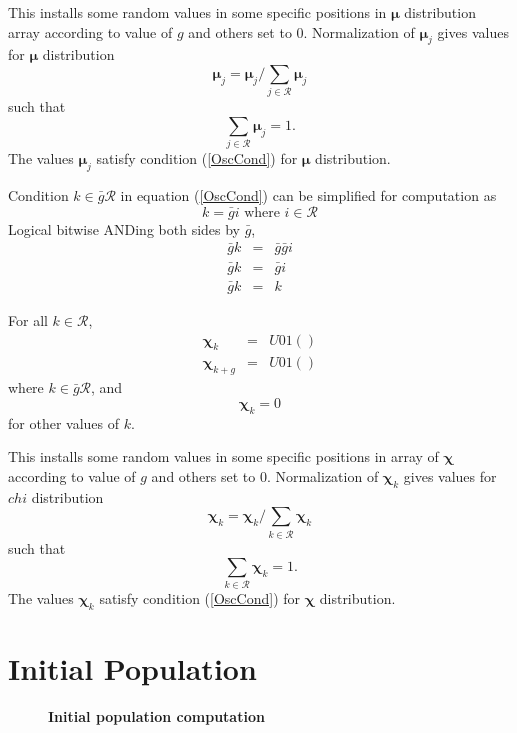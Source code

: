 This installs some random values in some specific positions in $\bm{\mu}$ distribution array according to value of $g$ and others set to $0$. 
Normalization of $\bm{\mu}_j$ gives values for $\bm{\mu}$ distribution
\[
\bm{\mu}_j = \bm{\mu}_j / \sum \limits_{j \in \mathcal{R} } \bm{\mu}_j
\]
such that 
\[
\sum \limits_{j \in \mathcal{R} } \bm{\mu}_j = 1.
\]
The values $\bm{\mu}_j$ satisfy condition (\ref{OscCond}) for $\bm{\mu}$ distribution.


Condition $k \in \bar{g} \mathcal{R}$ in equation (\ref{OscCond}) can be simplified for computation as
\[
k = \bar{g} i  \text{ where $i \in \mathcal{R}$}
\]
Logical bitwise ANDing both sides by $\bar{g}$,
\begin{eqnarray*}
\bar{g} k & = & \bar{g} \bar{g} i \\
\bar{g} k & = & \bar{g} i \\
\bar{g} k & = & k 
\end{eqnarray*}

For all $k \in \mathcal{R}$,
\begin{eqnarray*}
\bm{\chi}_k & = & U01() \\
\bm{\chi}_{k+g} & = & U01() 
\end{eqnarray*}
where $k \in \bar{g} \mathcal{R}$, and
\[
\bm{\chi}_k = 0
\]
for other values of $k$. \newline

This installs some random values in some specific positions in array of $\bm{\chi}$ according to value of $g$ 
and others set to $0$. Normalization of $\bm{\chi}_k$ gives values for $chi$ distribution 
\[
\bm{\chi}_k = \bm{\chi}_k/\sum\limits_{k \in \mathcal{R}} \bm{\chi}_k
\]
such that 
\[
\sum\limits_{k \in \mathcal{R}} \bm{\chi}_k = 1.
\]
The values $\bm{\chi}_k$ satisfy condition (\ref{OscCond}) for $\bm{\chi}$ distribution.

\section{Initial Population}
\label{InitPopOsc}

\begin{figure}[H]
\begin{center}
\hspace{4pt}
\caption{\textbf{Initial population computation} }
\label{initialpop}
\end{center}
\end{figure}


